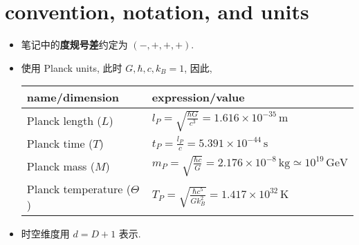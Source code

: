\chapter*{convention, notation, and units}
\begin{itemize}
	\item 笔记中的\textbf{度规号差}约定为 $\boldsymbol{(-, +, +, +)}$.
	
	\item 使用 Planck units, 此时 $G, \hbar, c, k_B = 1$, 因此,
	
	\begin{center}
		\begin{tabularx}{\linewidth}{XX}
			\toprule 
			name/dimension & expression/value \\
			\midrule 
			Planck length ($L$) & $l_P = \sqrt{\frac{\hbar G}{c^3}} = 1.616 \times 10^{- 35} \, \text{m}$ \\
			Planck time ($T$) & $t_P = \frac{l_P}{c} = 5.391 \times 10^{- 44} \, \text{s}$ \\
			Planck mass ($M$) & $m_P = \sqrt{\frac{\hbar c}{G}} = 2.176 \times 10^{- 8} \, \text{kg} \simeq 10^{19} \, \text{GeV}$ \\
			Planck temperature ($\Theta$) & $T_P = \sqrt{\frac{\hbar c^5}{G k_B^2}} = 1.417 \times 10^{32} \, \text{K}$ \\
			\bottomrule
		\end{tabularx}
	\end{center}
	
	\item 时空维度用 $d = D + 1$ 表示.
\end{itemize}
